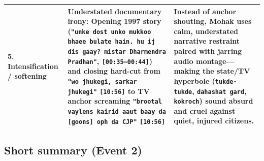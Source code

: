 \documentclass[10pt,a4paper]{article}
\begin{document}
\begin{longtable}{@{}>{\raggedright\arraybackslash}p{} >{\raggedright\arraybackslash}p{} >{\raggedright\arraybackslash}p{}@{}}
\addlinespace[4pt]
\textbf{5. Intensification / softening} & \textbf{Understated documentary irony:} Opening 1997 story (\texttt{"unke dost unko mukkoo bhaee bulate hain. hu ij dis gaay? mistar Dharmendra Pradhan"}, \texttt{[00:35--00:44]}) and closing hard-cut from \texttt{"wo jhukegi, sarkar jhukegi"} \texttt{[10:56]} to TV anchor screaming \texttt{"brootal vaylens kairid aaut baay da [goons] oph da CJP"} \texttt{[10:56]} & Instead of anchor shouting, Mohak uses \textbf{calm, understated narrative restraint} paired with jarring audio montage---making the state/TV hyperbole (\texttt{tukde-tukde}, \texttt{dahashat gard}, \texttt{kokroch}) sound absurd and cruel against quiet, injured citizens. \\
\bottomrule
\end{longtable}

\subsection*{Short summary (Event 2)}
\end{document}
